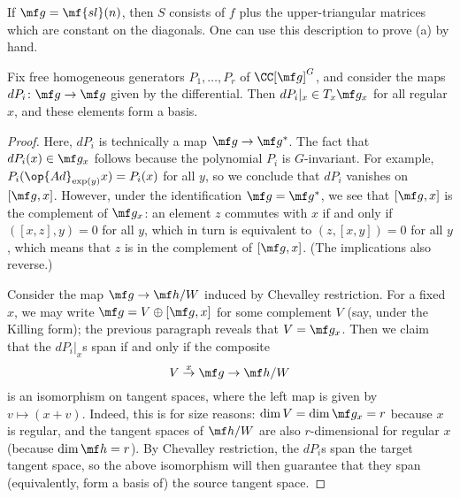 \documentclass[../notes.tex]{subfiles}
\begin{document}
\begin{example}
	If $\mf g=\mf{sl}(n)$, then $S$ consists of $f$ plus the upper-triangular matrices which are constant on the diagonals. One can use this description to prove (a) by hand.
\end{example}
\begin{lemma} \label{lem:get-kostant-slice}
	Fix free homogeneous generators $P_1,\ldots,P_r$ of $\CC[\mf g]^G$, and consider the maps $dP_i\colon\mf g\to\mf g$ given by the differential. Then $dP_i|_x\in T_x\mf g_x$ for all regular $x$, and these elements form a basis.
\end{lemma}
\begin{proof}
	Here, $dP_i$ is technically a map $\mf g\to\mf g^*$. The fact that $dP_i(x)\in\mf g_x$ follows because the polynomial $P_i$ is $G$-invariant. For example, $P_i(\op{Ad}_{\exp(y)}x)=P_i(x)$ for all $y$, so we conclude that $dP_i$ vanishes on $[\mf g,x]$. However, under the identification $\mf g=\mf g^*$, we see that $[\mf g,x]$ is the complement of $\mf g_x$: an element $z$ commutes with $x$ if and only if $([x,z],y)=0$ for all $y$, which in turn is equivalent to $(z,[x,y])=0$ for all $y$, which means that $z$ is in the complement of $[\mf g,x]$. (The implications also reverse.)

	Consider the map $\mf g\to\mf h/W$ induced by Chevalley restriction. For a fixed $x$, we may write $\mf g=V\oplus[\mf g,x]$ for some complement $V$ (say, under the Killing form); the previous paragraph reveals that $V=\mf g_x$. Then we claim that the $dP_i|_x$s span if and only if the composite
	\[V\stackrel x\to\mf g\to\mf h/W\]
	is an isomorphism on tangent spaces, where the left map is given by $v\mapsto(x+v)$. Indeed, this is for size reasons: $\dim V=\dim\mf g_x=r$ because $x$ is regular, and the tangent spaces of $\mf h/W$ are also $r$-dimensional for regular $x$ (because $\dim\mf h=r$). By Chevalley restriction, the $dP_i$s span the target tangent space, so the above isomorphism will then guarantee that they span (equivalently, form a basis of) the source tangent space. %



\end{proof}
\end{document}
